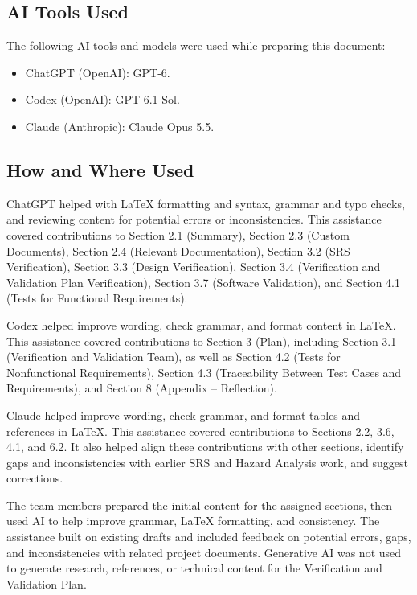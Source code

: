 \documentclass[12pt, titlepage]{article}
\begin{document}
\subsection{AI Tools Used}
The following AI tools and models were used while preparing this document:
\begin{itemize}
    \item ChatGPT (OpenAI): GPT-6.
    \item Codex (OpenAI): GPT-6.1 Sol.
    \item Claude (Anthropic): Claude Opus 5.5.
\end{itemize}

\subsection{How and Where Used}
ChatGPT helped with LaTeX formatting and syntax, grammar and typo checks, and reviewing content for potential errors or inconsistencies. This assistance covered contributions to Section 2.1 (Summary), Section 2.3 (Custom Documents), Section 2.4 (Relevant Documentation), Section 3.2 (SRS Verification), Section 3.3 (Design Verification), Section 3.4 (Verification and Validation Plan Verification), Section 3.7 (Software Validation), and Section 4.1 (Tests for Functional Requirements).

\medskip\noindent
Codex helped improve wording, check grammar, and format content in LaTeX. This assistance covered contributions to Section 3 (Plan), including Section 3.1 (Verification and Validation Team), as well as Section 4.2 (Tests for Nonfunctional Requirements), Section 4.3 (Traceability Between Test Cases and Requirements), and Section 8 (Appendix -- Reflection). 

\medskip\noindent
Claude helped improve wording, check grammar, and format tables and references in LaTeX. This assistance covered contributions to Sections 2.2, 3.6, 4.1, and 6.2. It also helped align these contributions with other sections, identify gaps and inconsistencies with earlier SRS and Hazard Analysis work, and suggest corrections.

\medskip\noindent
The team members prepared the initial content for the assigned sections, then used AI to help improve grammar, LaTeX formatting, and consistency. The assistance built on existing drafts and included feedback on potential errors, gaps, and inconsistencies with related project documents. Generative AI was not used to generate research, references, or technical content for the Verification and Validation Plan.
\end{document}
